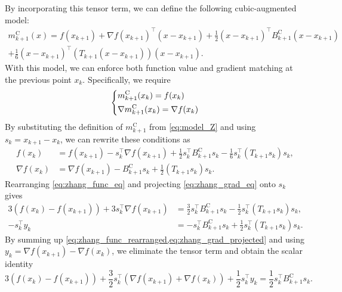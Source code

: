 \documentclass[0_en]{subfiles}
\begin{document}
By incorporating this tensor term, we can define the following cubic-augmented model:
\begin{multline}
    m^\mathrm{C}_{k+1}(x) = f(x_{k+1}) + \nabla f(x_{k+1})^\top (x - x_{k+1}) + \frac{1}{2} (x - x_{k+1})^\top B_{k+1}^{\mathrm{C}} (x - x_{k+1})\\ + \frac{1}{6}(x - x_{k+1})^\top (T_{k+1} (x - x_{k+1})) (x - x_{k+1}).
    \label{eq:model_Z}
\end{multline}
With this model, we can enforce both function value and gradient matching at the previous point $x_k$.
Specifically, we require
\begin{equation}
    \begin{dcases}
        m^\mathrm{C}_{k+1}(x_k) = f(x_k) \\
        \nabla m^\mathrm{C}_{k+1}(x_k) = \nabla f(x_k)
    \end{dcases}
    \label{eq:msecZ_xk}
\end{equation}
By substituting the definition of $m^\mathrm{C}_{k+1}$ from \cref{eq:model_Z} and using $s_k = x_{k+1} - x_k$, we can rewrite these conditions as
\begin{align}
    f(x_k)        & = f(x_{k+1}) - s_k^\top \nabla f(x_{k+1}) + \frac{1}{2} s_k^\top B^\mathrm{C}_{k+1} s_k - \frac{1}{6} s_k^\top (T_{k+1} s_k) s_k,  \label{eq:zhang_func_eq} \\
    \nabla f(x_k) & = \nabla f(x_{k+1}) - B^\mathrm{C}_{k+1} s_k + \frac{1}{2} (T_{k+1} s_k) s_k.
    \label{eq:zhang_grad_eq}
\end{align}
Rearranging \cref{eq:zhang_func_eq} and projecting \cref{eq:zhang_grad_eq} onto $s_k$ gives
\begin{align}
    3(f(x_k) - f(x_{k+1})) +3 s_k^\top \nabla f(x_{k+1}) & = \frac{3}{2} s_k^\top B^{\mathrm{C}}_{k+1} s_k - \frac{1}{2} s_k^\top (T_{k+1} s_k) s_k, \label{eq:zhang_func_rearranged} \\
    -s_k^\top y_k                                        & = -s_k^\top B^{\mathrm{C}}_{k+1} s_k + \frac{1}{2} s_k^\top (T_{k+1} s_k) s_k. \label{eq:zhang_grad_projected}
\end{align}
By summing up \cref{eq:zhang_func_rearranged,eq:zhang_grad_projected} and using $y_k = \nabla f(x_{k+1}) - \nabla f(x_k)$, we eliminate the tensor term and obtain the scalar identity
\begin{equation}
    3(f(x_k) - f(x_{k+1}))
    + \frac{3}{2} s_k^\top (\nabla f(x_{k+1}) + \nabla f(x_k)) + \frac{1}{2} s_k^\top y_k
    = \frac{1}{2} s_k^\top B^{\mathrm{C}}_{k+1} s_k.
    \label{eq:zhang_scalar_identity}
\end{equation}
\end{document}
